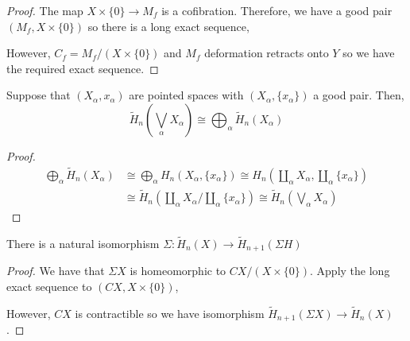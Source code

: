 \documentclass[12pt]{extarticle}
\begin{document}
\begin{proof}
The map $X \times \{0\} \to M_f$ is a cofibration. Therefore, we have a good pair $(M_f, X \times \{0\})$ so there is a long exact sequence,

\begin{center}
\end{center}
However, $C_f = M_f / ( X \times \{0\} )$ and $M_f$ deformation retracts onto $Y$ so we have the required exact sequence.
\end{proof}

\begin{corollary}
Suppose that $(X_\alpha, x_\alpha)$ are pointed spaces with $(X_\alpha, \{x_\alpha\})$ a good pair. Then,
\[ \tilde{H}_n \left(\bigvee_{\alpha} X_\alpha \right) \cong \bigoplus_{\alpha} \tilde{H}_n(X_\alpha) \]
\end{corollary}

\begin{proof}
\begin{align*}
\bigoplus_{\alpha} \tilde{H}_n(X_\alpha) & \cong \bigoplus_\alpha H_n(X_\alpha, \{x_\alpha\}) \cong H_n \left( \coprod_{\alpha} X_\alpha, \coprod_{\alpha} \{x_\alpha\} \right) 
\\
& \cong \tilde{H}_n\left(  \coprod_{\alpha} X_\alpha \bigg/ \coprod_{\alpha} \{x_\alpha\}  \right) \cong \tilde{H}_n \left( \bigvee_{\alpha} X_{\alpha} \right)
\end{align*}
\end{proof}

\begin{corollary}
There is a natural isomorphism $\Sigma : \tilde{H}_n(X) \to \tilde{H}_{n+1}(\Sigma H)$
\end{corollary}

\begin{proof}
We have that $\Sigma X$ is homeomorphic to $CX/(X \times \{0\})$. Apply the long exact sequence to $(CX, X \times \{0\})$, 
\begin{center}
\end{center}
However, $CX$ is contractible so we have isomorphism $\tilde{H}_{n+1}(\Sigma X) \to \tilde{H}_n(X)$. 
\end{proof}
\end{document}
